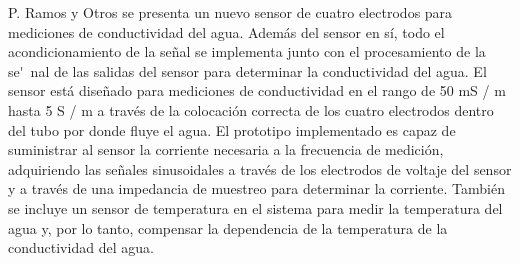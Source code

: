  P. Ramos y Otros \cite{ramos2008four} se presenta un nuevo sensor de cuatro electrodos para mediciones de conductividad del agua. Adem\'as del sensor en s\'i, todo el acondicionamiento de la se\~nal se implementa junto con el procesamiento de la se\'~nal de las salidas del sensor para determinar la conductividad del agua. El sensor est\'a dise\~nado para mediciones de conductividad en el rango de 50 mS / m hasta 5 S / m a trav\'es de la colocaci\'on correcta de los cuatro electrodos dentro del tubo por donde fluye el agua. El prototipo implementado es capaz de suministrar al sensor la corriente necesaria a la frecuencia de medici\'on, adquiriendo las señales sinusoidales a trav\'es de los electrodos de voltaje del sensor y a trav\'es de una impedancia de muestreo para determinar la corriente. Tambi\'en se incluye un sensor de temperatura en el sistema para medir la temperatura del agua y, por lo tanto, compensar la dependencia de la temperatura de la conductividad del agua.